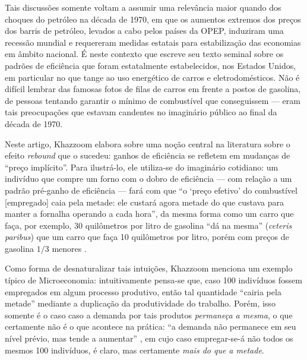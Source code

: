 Tais discussões somente voltam a assumir uma relevância maior quando dos choques do petróleo na década de 1970, em que os aumentos extremos dos preços dos barris de petróleo, levados a cabo pelos países da OPEP, induziram uma recessão mundial e requereram medidas estatais para estabilização das economias em âmbito nacional. É neste contexto que \textcite{Khazzoom1980} escreve seu texto seminal sobre os padrões de eficiência que foram estatalmente estabelecidos, nos Estados Unidos, em particular no que tange ao uso energético de carros e eletrodomésticos. Não é difícil lembrar das famosas fotos de filas de carros em frente a postos de gasolina, de pessoas tentando garantir o mínimo de combustível que conseguissem --- eram tais preocupações que estavam candentes no imaginário público ao final da década de 1970.

Neste artigo, Khazzoom elabora sobre uma noção central na literatura sobre o efeito \textit{rebound} que o sucedeu: ganhos de eficiência se refletem em mudanças de ``preço implícito''. Para ilustrá-lo, ele utiliza-se do imaginário cotidiano: um indivíduo que compre um forno com o dobro de eficiência --- com relação a um padrão pré-ganho de eficiência --- fará com que ``o `preço efetivo' do combustível [empregado] caia pela metade: ele custará agora metade do que custava para manter a fornalha operando a cada hora'', da mesma forma como um carro que faça, por exemplo, 30 quilômetros por litro de gasolina ``dá na mesma'' (\textit{ceteris paribus}) que um carro que faça 10 quilômetros por litro, porém com preços de gasolina $1/3$ menores \parencite[p. 22]{Khazzoom1980}. %

Como forma de desnaturalizar tais intuições, Khazzoom menciona um exemplo típico de Microeconomia: intuitivamente pensa-se que, caso 100 indivíduos fossem empregados em algum processo produtivo, então tal quantidade ``cairia pela metade'' mediante a duplicação da produtividade do trabalho. Porém, isso somente é o caso caso a demanda por tais produtos \textit{permaneça a mesma}, o que certamente não é o que acontece na prática: ``a demanda não permanece em seu nível prévio, mas tende a aumentar'' \parencite[p. 23]{Khazzoom1980}, em cujo caso empregar-se-á não todos os mesmos 100 indivíduos, é claro, mas certamente \textit{mais do que a metade}.

